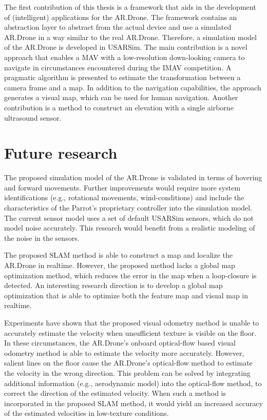 The first contribution of this thesis is a framework that aids in the development of (intelligent) applications for the AR.Drone.
The framework contains an abstraction layer to abstract from the actual device and use a simulated AR.Drone in a way similar to the real AR.Drone.
Therefore, a simulation model of the AR.Drone is developed in USARSim.
The main contribution is a novel approach that enables a MAV with a low-resolution down-looking camera to navigate in circumstances encountered during the IMAV competition.
A pragmatic algorithm is presented to estimate the transformation between a camera frame and a map.
In addition to the navigation capabilities, the approach generates a visual map, which can be used for human navigation.
Another contribution is a method to construct an elevation with a single airborne ultrasound sensor.

\section{Future research}
\label{sec:conclusions-future}

The proposed simulation model of the AR.Drone is validated in terms of hovering and forward movements. 
Further improvements would require more system identifications (e.g., rotational movements, wind-conditions) and include the characteristics of the Parrot's proprietary controller into the simulation model. 
The current sensor model uses a set of default USARSim sensors, which do not model noise accurately.
This research would benefit from a realistic modeling of the noise in the sensors.

The proposed SLAM method is able to construct a map and localize the AR.Drone in realtime.
However, the proposed method lacks a global map optimization method, which reduces the error in the map when a loop-closure is detected.
An interesting research direction is to develop a global map optimization that is able to optimize both the feature map and visual map in realtime.

Experiments have shown that the proposed visual odometry method is unable to accurately estimate the velocity when unsufficient texture is visible on the floor.
In these circumstances, the AR.Drone's onboard optical-flow based visual odometry method is able to estimate the velocity more accurately.
However, salient lines on the floor cause the AR.Drone's optical-flow method to estimate the velocity in the wrong direction.
This problem can be solved by integrating additional information (e.g., aerodynamic model) into the optical-flow method, to correct the direction of the estimated velocity.
When such a method is incorporated in the proposed SLAM method, it would yield an increased accuracy of the estimated velocities in low-texture conditions.

